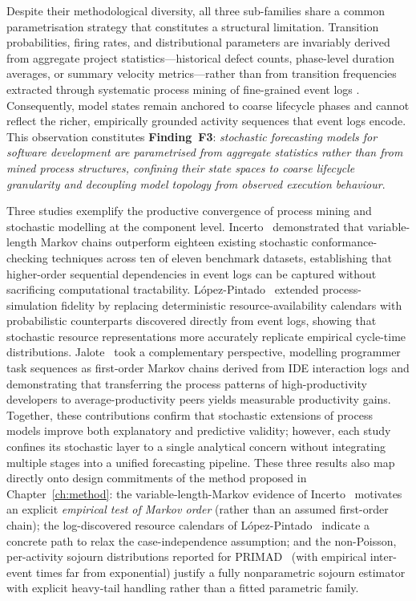 Despite their methodological diversity, all three sub-families share a common
parametrisation strategy that constitutes a structural limitation. Transition
probabilities, firing rates, and distributional parameters are invariably derived
from aggregate project statistics---historical defect counts, phase-level duration
averages, or summary velocity metrics---rather than from transition frequencies
extracted through systematic process mining of fine-grained event logs
\cite{nafreen2020,bhadra2022,li2020}. Consequently, model states remain anchored
to coarse lifecycle phases and cannot reflect the richer, empirically grounded
activity sequences that event logs encode. This observation constitutes
\textbf{Finding~F3}: \emph{stochastic forecasting models for software development
are parametrised from aggregate statistics rather than from mined process
structures, confining their state spaces to coarse lifecycle granularity and
decoupling model topology from observed execution behaviour}.

Three studies exemplify the productive convergence of process mining and
stochastic modelling at the component level. Incerto~\cite{incerto2025}
demonstrated that variable-length Markov chains outperform eighteen existing
stochastic conformance-checking techniques across ten of eleven benchmark
datasets, establishing that higher-order sequential dependencies in event logs
can be captured without sacrificing computational tractability.
L\'opez-Pintado~\cite{lopezpintado2023} extended process-simulation fidelity by
replacing deterministic resource-availability calendars with probabilistic
counterparts discovered directly from event logs, showing that stochastic
resource representations more accurately replicate empirical cycle-time
distributions. Jalote~\cite{jalote2021} took a complementary perspective,
modelling programmer task sequences as first-order Markov chains derived from
IDE interaction logs and demonstrating that transferring the process patterns of
high-productivity developers to average-productivity peers yields measurable
productivity gains. Together, these contributions confirm that stochastic
extensions of process models improve both explanatory and predictive validity;
however, each study confines its stochastic layer to a single analytical
concern without integrating multiple stages into a unified forecasting pipeline.
These three results also map directly onto design commitments of the method
proposed in Chapter~\ref{ch:method}: the variable-length-Markov evidence of
Incerto~\cite{incerto2025} motivates an explicit \emph{empirical test of
Markov order} (rather than an assumed first-order chain); the
log-discovered resource calendars of L\'opez-Pintado~\cite{lopezpintado2023}
indicate a concrete path to relax the case-independence assumption; and the
non-Poisson, per-activity sojourn distributions reported for
PRIMAD~\cite{guinea2025} (with empirical inter-event times far from
exponential) justify a fully nonparametric sojourn estimator with explicit
heavy-tail handling rather than a fitted parametric family.

